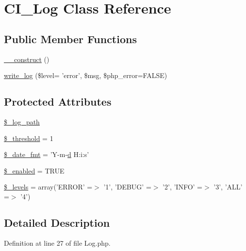 \hypertarget{class_c_i___log}{\section{C\-I\-\_\-\-Log Class Reference}
\label{class_c_i___log}
}
\subsection*{Public Member Functions}
\begin{DoxyCompactItemize}
\item 
\hyperlink{class_c_i___log_a095c5d389db211932136b53f25f39685}{\-\_\-\-\_\-construct} ()
\item 
\hyperlink{class_c_i___log_a7a050d4e85d5b176646ec2f424641da4}{write\-\_\-log} (\$level= 'error', \$msg, \$php\-\_\-error=F\-A\-L\-S\-E)
\end{DoxyCompactItemize}
\subsection*{Protected Attributes}
\begin{DoxyCompactItemize}
\item 
\hyperlink{class_c_i___log_a3eaf9e92941ee6be33bc972ab76b4caf}{\$\-\_\-log\-\_\-path}
\item 
\hyperlink{class_c_i___log_a0fc9914bdaf300fa9a1745201204e73f}{\$\-\_\-threshold} = 1
\item 
\hyperlink{class_c_i___log_aab5c1870169c8e04ede18245f04ad85c}{\$\-\_\-date\-\_\-fmt} = 'Y-\/m-\/\hyperlink{bootstrap_8min_8js_aeb337d295abaddb5ec3cb34cc2e2bbc9}{d} H\-:i\-:s'
\item 
\hyperlink{class_c_i___log_af8233d47e8ad3e624ba168154d2f383d}{\$\-\_\-enabled} = T\-R\-U\-E
\item 
\hyperlink{class_c_i___log_aeb1c4747136537731b6cfed6f1e64941}{\$\-\_\-levels} = array('E\-R\-R\-O\-R' =$>$ '1', 'D\-E\-B\-U\-G' =$>$ '2', 'I\-N\-F\-O' =$>$ '3', 'A\-L\-L' =$>$ '4')
\end{DoxyCompactItemize}


\subsection{Detailed Description}


Definition at line 27 of file Log.\-php.



